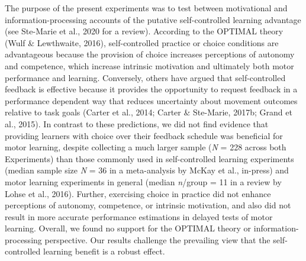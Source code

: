 \documentclass[
  man, donotrepeattitle,floatsintext]{apa7}
\begin{document}
The purpose of the present experiments was to test between motivational and information-processing accounts of the putative self-controlled learning advantage (see Ste-Marie et al., 2020 for a review). According to the OPTIMAL theory (Wulf \& Lewthwaite, 2016), self-controlled practice or choice conditions are advantageous because the provision of choice increases perceptions of autonomy and competence, which increase intrinsic motivation and ultimately both motor performance and learning. Conversely, others have argued that self-controlled feedback is effective because it provides the opportunity to request feedback in a performance dependent way that reduces uncertainty about movement outcomes relative to task goals (Carter et al., 2014; Carter \& Ste-Marie, 2017b; Grand et al., 2015). In contrast to these predictions, we did not find evidence that providing learners with choice over their feedback schedule was beneficial for motor learning, despite collecting a much larger sample (\emph{N} = 228 across both Experiments) than those commonly used in self-controlled learning experiments (median sample size \emph{N} = 36 in a meta-analysis by McKay et al., in-press) and motor learning experiments in general (median \emph{n}/group = 11 in a review by Lohse et al., 2016). Further, exercising choice in practice did not enhance perceptions of autonomy, competence, or intrinsic motivation, and also did not result in more accurate performance estimations in delayed tests of motor learning. Overall, we found no support for the OPTIMAL theory or information-processing perspective. Our results challenge the prevailing view that the self-controlled learning benefit is a robust effect.
\end{document}

